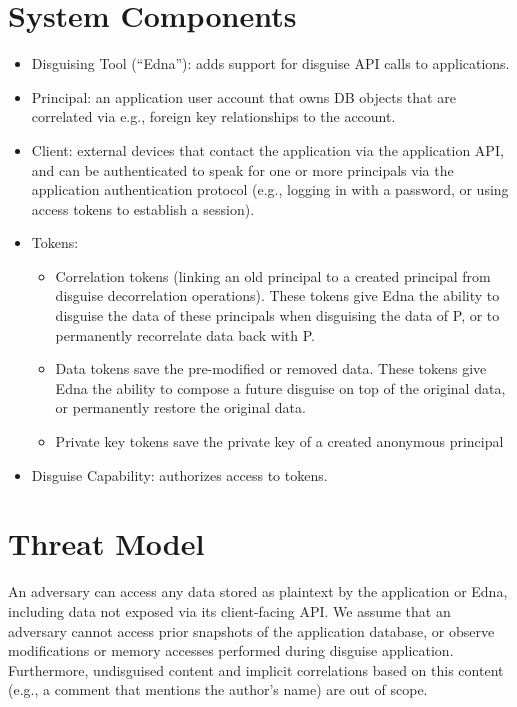 \section{System Components}
\begin{itemize}
\item Disguising Tool (``Edna''): adds support for disguise API calls to applications.
\item Principal: an application user account that owns DB objects that are correlated via e.g., foreign key relationships to the account.
\item Client: external devices that contact the application via the application API, and can be authenticated to speak for one or more principals via the application authentication protocol (e.g., logging in with a password, or using access tokens to establish a session).
\item Tokens: 
\begin{itemize}
    \item Correlation tokens (linking an old principal to a created principal from disguise decorrelation operations). These tokens give Edna the ability to disguise the data of these principals when disguising the data of P, or to permanently recorrelate data back with P.
    \item Data tokens save the pre-modified or removed data. These tokens give Edna the ability to compose a future disguise on top of the original data, or permanently restore the original data.
    \item Private key tokens save the private key of a created anonymous principal
\end{itemize}
\item Disguise Capability: authorizes access to tokens.
\end{itemize}

\section{Threat Model}
An adversary can access any data stored as plaintext by the application or Edna, including data not exposed via its
client-facing API. We assume that an adversary cannot access prior snapshots of the application database, or observe modifications or memory accesses performed during disguise application. Furthermore, undisguised content and implicit correlations based on this content (e.g., a comment that mentions the author’s name) are out of scope.

